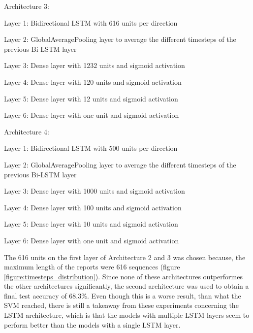 Architecture 3:
\begin{addmargin}[1em]{0em}
    \begin{description}
        \item Layer 1: Bidirectional LSTM with 616 units per direction
        \item Layer 2: GlobalAveragePooling layer to average the different timesteps of the previous Bi-LSTM layer
        \item Layer 3: Dense layer with 1232 units and sigmoid activation
        \item Layer 4: Dense layer with 120 units and sigmoid activation
        \item Layer 5: Dense layer with 12 units and sigmoid activation
        \item Layer 6: Dense layer with one unit and sigmoid activation
    \end{description}
\end{addmargin}

Architecture 4:
\begin{addmargin}[1em]{1em}
    \begin{description}
        \item Layer 1: Bidirectional LSTM with 500 units per direction
        \item Layer 2: GlobalAveragePooling layer to average the different timesteps of the previous Bi-LSTM layer
        \item Layer 3: Dense layer with 1000 units and sigmoid activation
        \item Layer 4: Dense layer with 100 units and sigmoid activation
        \item Layer 5: Dense layer with 10 units and sigmoid activation
        \item Layer 6: Dense layer with one unit and sigmoid activation
    \end{description}
\end{addmargin}
The 616 units on the first layer of Architecture 2 and 3 was chosen because, the maximum length of the reports were 616 sequences (figure \ref{figure:timesteps_distribution}).
Since none of these architectures outperformes the other architectures significantly, the second architecture was used to obtain a final test accuracy of 68.3\%.
Even though this is a worse result, than what the \ac{SVM} reached, there is still a takeaway from these experiments concerning the LSTM architecture, which is that the models with multiple LSTM layers seem to perform better than the models with a single LSTM layer.


